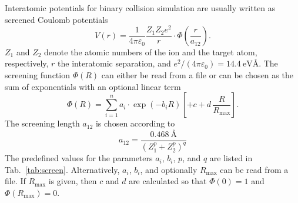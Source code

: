 Interatomic potentials for binary collision simulation are usually written
as screened Coulomb potentials
%
\begin{equation}
   V(r) = \frac{1}{4 \pi \varepsilon_0} \frac{Z_1 Z_2 e^2}{r} 
          \cdot \Phi(\frac{r}{a_{12}}).
   \label{eq:screenedCoulomb}
\end{equation}
%
$Z_1$ and $Z_2$ denote the atomic numbers of the ion and the target atom, 
respectively, $r$ the interatomic separation, and 
$e^2/(4 \pi \varepsilon_0) = 14.4~\mbox{eV\AA}$. The screening function 
$\Phi(R)$ can either be read from a file or can be chosen as the sum of 
exponentials with an optional linear term
%
\begin{equation}
   \Phi(R) = \sum_{i=1}^n a_i \cdot \exp(-b_i R) 
             \left[ + c + d \, \frac{R}{R_\mathrm{max}} \right] .
    \label{eq:Phi}
\end{equation}
%
The screening length $a_{12}$ is chosen according to
%
\begin{equation}
   a_{12} = \frac{0.468~\mbox{\AA}}{\left(Z_1^p + Z_2^p\right)^q}
   \label{eq:ascr}
\end{equation}
%
The predefined values for the parameters $a_i$, $b_i$, $p$, and $q$ are listed 
in Tab.~\ref{tab:screen}. Alternatively, $a_i$, $b_i$, and optionally 
$R_\mathrm{max}$ can be read from a file. If $R_\mathrm{max}$ is given, then 
$c$ and $d$ are calculated so that $\Phi(0)=1$ and $\Phi(R_\mathrm{max})=0$.
%
